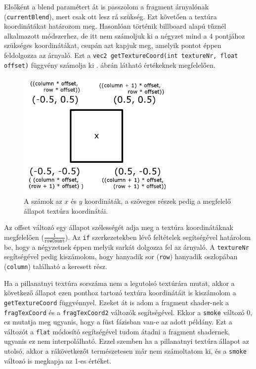 Elsőként a blend paramétert át is passzolom a fragment árnyalónak (\texttt{currentBlend}), mert csak ott lesz rá szükség. Ezt követően a textúra koordinátákat határozom meg. Hasonlóan történik billboard alapú tűznél alkalmazott módszerhez, de itt nem számoljuk ki a négyzet mind a 4 pontjához szükséges koordinátákat, csupán azt kapjuk meg, amelyik pontot éppen feldolgozza az árnyaló. Ezt a \texttt{vec2 getTextureCoord(int textureNr, float offset)} függvény számolja ki . ábrán látható értékeknek megfelelően.

\begin{figure}[h]
 \centering
 \includegraphics[width=0.7\textwidth]{kepek/particleBillboard.png}
 \caption{A számok az $x$ és $y$ koordináták, a szöveges részek pedig a megfelelő állapot textúra koordinátái.}
 \label{fig:particleBillboard}
\end{figure}

Az offset változó egy állapot szélességét adja meg a textúra koordinátáknak megfelelően ($\frac{1}{\texttt{rowCount}}$). Az \texttt{if} szerkezetekben lévő feltételek segítségével határolom be, hogy a négyzetnek éppen melyik sarkát dolgozza fel az árnyaló. A \texttt{textureNr} segítségével pedig kiszámolom, hogy hanyadik sor (\texttt{row}) hanyadik oszlopában (\texttt{column}) található a keresett rész.

Ha a pillanatnyi textúra sorszáma nem a legutolsó textúrára mutat, akkor a következő állapot ezen ponthoz tartozó textúra koordinátáit is kiszámolom a \texttt{getTextureCoord} függvénnyel. Ezeket át is adom a fragment shader-nek a \texttt{fragTexCoord} és a \texttt{fragTexCoord2} változók segítségével. Ekkor a \texttt{smoke} változó 0, ez mutatja meg ugyanis, hogy a füst fázisban van-e az adott példány. Ezt a változót a \texttt{flat} módosító segítségével tudom átadni a fragment shadernek, ugyanis ez nem interpolálható. Ezzel szemben ha a pillanatnyi textúra állapot az utolsó, akkor a rákövetkezőt természetesen már nem számoltatom ki, és a \texttt{smoke} változó is megkapja az 1-es értéket.

